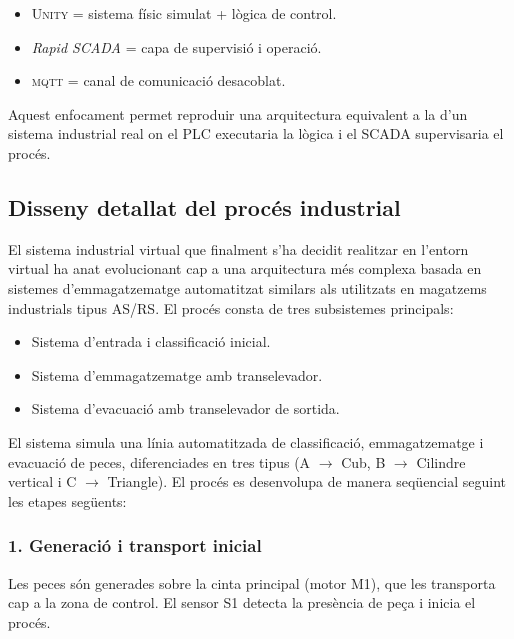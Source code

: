 \documentclass[a4paper,11pt,DIV=13,headings=normal,abstract=true,twoside=semi]{article}
\newcommand{\acro}[1]{\textsc{#1}}
\begin{document}
\begin{itemize}
\item \acro{Unity} = sistema físic simulat + lògica de control.
\item \emph{Rapid SCADA} = capa de supervisió i operació.
\item \acro{mqtt} = canal de comunicació desacoblat.
\end{itemize}

Aquest enfocament permet reproduir una arquitectura equivalent a la d'un sistema industrial real on el \acro{PLC} executaria la lògica i el \acro{SCADA} supervisaria el procés.

\subsection{Disseny detallat del procés industrial}

El sistema industrial virtual que finalment s'ha decidit realitzar en l'entorn virtual ha anat evolucionant cap a una arquitectura més complexa basada en sistemes d'emmagatzematge automatitzat similars als utilitzats en magatzems industrials tipus \acro{AS/RS}. El procés consta de tres subsistemes principals:

\begin{itemize}
\item Sistema d'entrada i classificació inicial.
\item Sistema d'emmagatzematge amb transelevador.
\item Sistema d'evacuació amb transelevador de sortida.
\end{itemize}


El sistema simula una línia automatitzada de classificació, emmagatzematge i evacuació de peces, diferenciades en tres tipus (A $\rightarrow$ Cub, B $\rightarrow$ Cilindre vertical i C $\rightarrow$ Triangle). El procés es desenvolupa de manera seqüencial seguint les etapes següents:

\subsubsection*{1. Generació i transport inicial}

Les peces són generades sobre la cinta principal (motor M1), que les transporta cap a la zona de control. El sensor S1 detecta la presència de peça i inicia el procés.
\end{document}
